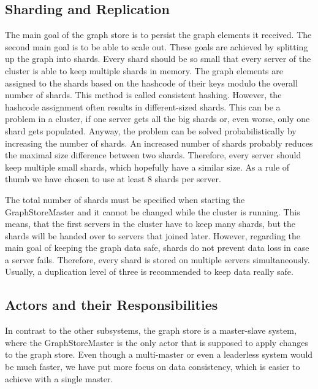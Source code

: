 \documentclass{sigchi}
\begin{document}
\subsection{Sharding and Replication}

The main goal of the graph store is to persist the graph elements it received. The second main goal is to be able to scale out. These goals are achieved by splitting up the graph into shards. Every shard should be so small that every server of the cluster is able to keep multiple shards in memory. The graph elements are assigned to the shards based on the hashcode of their keys modulo the overall number of shards. This method is called consistent hashing. However, the hashcode assignment often results in different-sized shards. This can be a problem in a cluster, if one server gets all the big shards or, even worse, only one shard gets populated. Anyway, the problem can be solved probabilistically by increasing the number of shards. An increased number of shards probably reduces the maximal size difference between two shards. Therefore, every server should keep multiple small shards, which hopefully have a similar size. As a rule of thumb we have chosen to use at least 8 shards per server.

The total number of shards must be specified when starting the GraphStoreMaster and it cannot be changed while the cluster is running. This means, that the first servers in the cluster have to keep many shards, but the shards will be handed over to servers that joined later. However, regarding the main goal of keeping the graph data safe, shards do not prevent data loss in case a server fails. Therefore, every shard is stored on multiple servers simultaneously. Usually, a duplication level of three is recommended to keep data really safe.

\subsection{Actors and their Responsibilities}

In contrast to the other subsystems, the graph store is a master-slave system, where the GraphStoreMaster is the only actor that is supposed to apply changes to the graph store. Even though a multi-master or even a leaderless system would be much faster, we have put more focus on data consistency, which is easier to achieve with a single master.
\end{document}
